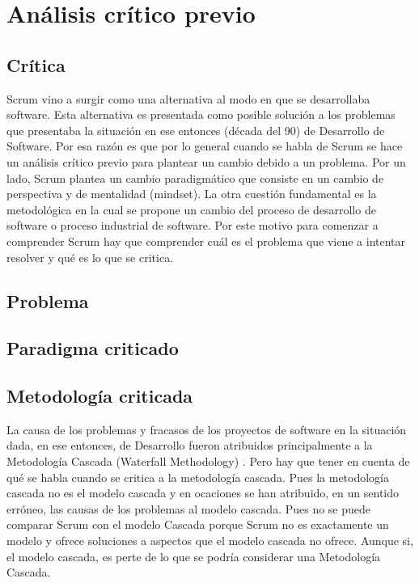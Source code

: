 \chapter{Análisis crítico previo}

\section{Crítica}

Scrum vino a surgir como una alternativa al modo en que se desarrollaba software. Esta alternativa es presentada como posible solución a los problemas que presentaba la situación en ese entonces (década del 90) de Desarrollo de Software. Por esa razón es que por lo general cuando se habla de Scrum se hace un análisis crítico previo para plantear un cambio debido a un problema. Por un lado, Scrum plantea un cambio paradigmático que consiste en un cambio de perspectiva y de mentalidad (mindset). La otra cuestión fundamental es la metodológica en la cual se propone un cambio del proceso de desarrollo de software o proceso industrial de software. Por este motivo para comenzar a comprender Scrum hay que comprender cuál es el problema que viene a intentar resolver y qué es lo que se critica.

\section{Problema}

\section{Paradigma criticado}

\section{Metodología criticada}

La causa de los problemas y fracasos de los proyectos de software en la situación dada, en ese entonces, de Desarrollo fueron atribuidos principalmente a la Metodología Cascada (Waterfall Methodology) \cite{Ken-Schwaber-1995}. Pero hay que tener en cuenta de qué se habla cuando se critica a la metodología cascada. Pues la metodología cascada no es el modelo cascada y en ocaciones se han atribuido, en un sentido erróneo, las causas de los problemas al modelo cascada. Pues no se puede comparar Scrum con el modelo Cascada porque Scrum no es exactamente un modelo y ofrece soluciones a aspectos que el modelo cascada no ofrece. Aunque si, el modelo cascada, es perte de lo que se podría considerar una Metodología Cascada. 

